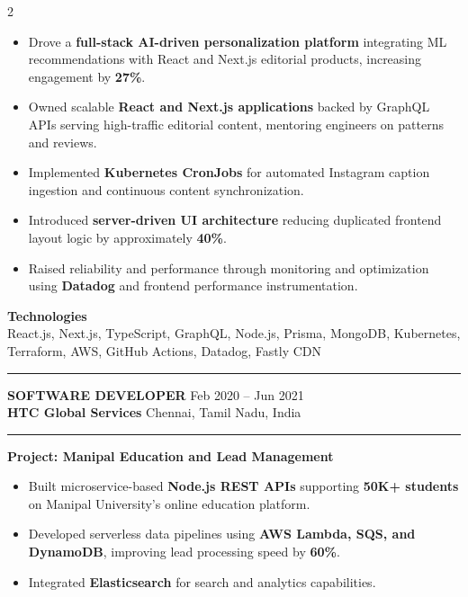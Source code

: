 \documentclass[10pt,a4paper]{article}
\newcommand{\blockdivider}{\vspace{0pt}\color{rulecolor}\rule{\linewidth}{0.5pt}\color{primary}\vspace{4pt}}
\newcommand{\roleheader}[4]{%
  \noindent
  \textbf{\MakeUppercase{#3}}%
  \hfill
  \textcolor{secondary}{#4}\\[0pt]

  \noindent
  \textbf{#1}%
  \hfill
  \textcolor{secondary}{#2}\\[0pt]
}
\newcommand{\roledivider}{%
  \vspace{-1pt}%
  {\color{rulecolor}\rule{\linewidth}{0.5pt}}%
  \vspace{2pt}%
}
\newcommand{\projecttitle}[1]{\textbf{#1}\par\vspace{2pt}}
\begin{document}
\begin{paracol}{2}
\begin{itemize}

\item Drove a \textbf{full-stack AI-driven personalization platform} integrating ML recommendations with React and Next.js editorial products, increasing engagement by \textbf{27\%}.

\item Owned scalable \textbf{React and Next.js applications} backed by GraphQL APIs serving high-traffic editorial content, mentoring engineers on patterns and reviews.

\item Implemented \textbf{Kubernetes CronJobs} for automated Instagram caption ingestion and continuous content synchronization.

\item Introduced \textbf{server-driven UI architecture} reducing duplicated frontend layout logic by approximately \textbf{40\%}.

\item Raised reliability and performance through monitoring and optimization using \textbf{Datadog} and frontend performance instrumentation.

\end{itemize}

\textbf{Technologies}\\
React.js, Next.js, TypeScript, GraphQL, Node.js, Prisma, MongoDB, Kubernetes, Terraform, AWS, GitHub Actions, Datadog, Fastly CDN

\blockdivider

\roleheader{HTC Global Services}{Chennai, Tamil Nadu, India}{Software Developer}{Feb 2020 -- Jun 2021}
\roledivider

\projecttitle{Project: Manipal Education and Lead Management}
\begin{itemize}

\item Built microservice-based \textbf{Node.js REST APIs} supporting \textbf{50K+ students} on Manipal University's online education platform.

\item Developed serverless data pipelines using \textbf{AWS Lambda, SQS, and DynamoDB}, improving lead processing speed by \textbf{60\%}.

\item Integrated \textbf{Elasticsearch} for search and analytics capabilities.

\end{itemize}


\end{paracol}
\end{document}
